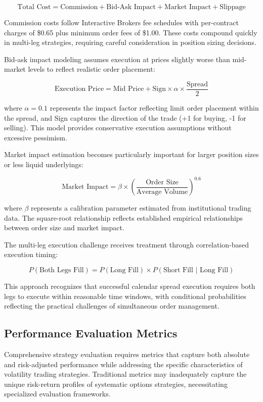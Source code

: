 \documentclass[
  american,
  11pt,
  11pt,
  letterpaper,
  onecolumn]{article}
\begin{document}
\[\text{Total Cost} = \text{Commission} + \text{Bid-Ask Impact} + \text{Market Impact} + \text{Slippage}\]

Commission costs follow Interactive Brokers fee schedules with
per-contract charges of \$0.65 plus minimum order fees of \$1.00. These
costs compound quickly in multi-leg strategies, requiring careful
consideration in position sizing decisions.

Bid-ask impact modeling assumes execution at prices slightly worse than
mid-market levels to reflect realistic order placement:

\[\text{Execution Price} = \text{Mid Price} + \text{Sign} \times \alpha \times \frac{\text{Spread}}{2}\]

where \(\alpha = 0.1\) represents the impact factor reflecting limit
order placement within the spread, and Sign captures the direction of
the trade (+1 for buying, -1 for selling). This model provides
conservative execution assumptions without excessive pessimism.

Market impact estimation becomes particularly important for larger
position sizes or less liquid underlyings:

\[\text{Market Impact} = \beta \times \left(\frac{\text{Order Size}}{\text{Average Volume}}\right)^{0.6}\]

where \(\beta\) represents a calibration parameter estimated from
institutional trading data. The square-root relationship reflects
established empirical relationships between order size and market
impact.

The multi-leg execution challenge receives treatment through
correlation-based execution timing:

\[P(\text{Both Legs Fill}) = P(\text{Long Fill}) \times P(\text{Short Fill | Long Fill})\]

This approach recognizes that successful calendar spread execution
requires both legs to execute within reasonable time windows, with
conditional probabilities reflecting the practical challenges of
simultaneous order management.

\subsection{Performance Evaluation
Metrics}\label{performance-evaluation-metrics}

Comprehensive strategy evaluation requires metrics that capture both
absolute and risk-adjusted performance while addressing the specific
characteristics of volatility trading strategies. Traditional metrics
may inadequately capture the unique risk-return profiles of systematic
options strategies, necessitating specialized evaluation frameworks.
\end{document}
